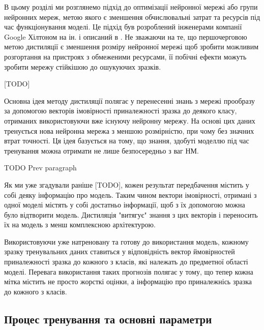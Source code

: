 \documentclass[14pt,a4paper]{extarticle}
\newcounter{e}
\numberwithin{equation}{section}
\numberwithin{figure}{section}
\begin{document}
 В цьому розділі ми розглянемо підхід до оптимізації нейронної мережі або групи нейронних мереж, метою якого є зменшення обчислювальні затрат та ресурсів під час функціонування моделі. Це підхід був розроблений інженерами компанії Google Хілтоном на ін. і описаний в \cite{distillation}. Не зважаючи на те, що першочерговою метою дистиляції є зменшення розміру нейронної мережі щоб зробити можливим розгортання на пристроях з обмеженими ресурсами, її побічні ефекти можуть зробити мережу стійкішою до ошукуючих зразків. 
 
 [TODO]
 \cite{defencive-distillation}
 
 Основна ідея методу дистиляції полягає у перенесенні знань з мережі прообразу за допомогою векторів імовірності приналежності зразка до деякого класу, отриманих використовуючи вже існуючу нейронну мережу. На основі цих даних тренується нова нейронна мережа з меншою розмірністю, при чому без значних втрат точності. Ця ідея базується на тому, що знання, здобуті моделлю під час тренування можна отримати не лише безпосередньо з ваг НМ.
 
 TODO Prev paragraph
 
 Як ми уже згадували раніше [TODO], кожен результат передбачення містить у собі деяку інформацію про модель. Таким чином вектори імовірності, отримані з одної моделі містять у собі достатньо інформації, щоб з їх допомогою можна було відтворити модель. Дистиляція "витягує" знання з цих векторів і переносить їх на модель з менш комплексною архітектурою.
 
 Використовуючи уже натреновану та готову до використання модель, кожному зразку тренувальних даних ставиться у відповідність вектор ймовірностей приналежності зразка до кожного з класів, які належать до предметної області моделі. Перевага використання таких прогнозів полягає у тому, що тепер кожна мітка містить не просто жорсткі оцінки, а інформацію про приналежнісь зразка до кожного з класів.
 
 \subsection{Процес тренування та основні параметри} 
 
\end{document}
